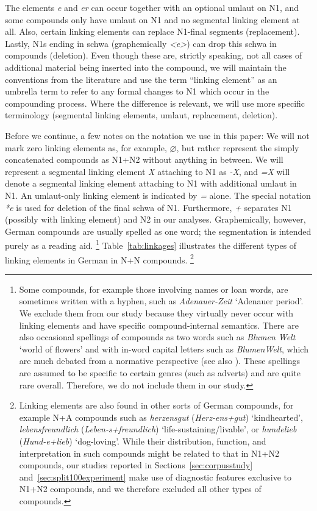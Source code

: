 The elements \textit{e} and \textit{er} can occur together with an optional umlaut on N1, and some compounds only have umlaut on N1 and no segmental linking element at all.
Also, certain linking elements can replace N1-final segments (replacement).
Lastly, N1s ending in schwa (graphemically \textit{<e>}) can drop this schwa in compounds (deletion).
Even though these are, strictly speaking, not all cases of additional material being inserted into the compound, we will maintain the conventions from the literature and use the term ``linking element'' as an umbrella term to refer to any formal changes to N1 which occur in the compounding process.
Where the difference is relevant, we will use more specific terminology (\ie segmental linking elements, umlaut, replacement, deletion).

Before we continue, a few notes on the notation we use in this paper: 
We will not mark zero linking elements as, for example, $\varnothing$, but rather represent the simply concatenated compounds as N1+N2 without anything in between. 
We will represent a segmental linking element \textit{X} attaching to N1 as \textit{-X}, and \textit{=X} will denote a segmental linking element attaching to N1 with additional umlaut in N1.
An umlaut-only linking element is indicated by \textit{=} alone.
The special notation \textit{*e} is used for deletion of the final schwa of N1.
Furthermore, \textit{+} separates N1 (possibly with linking element) and N2 in our analyses.
Graphemically, however, German compounds are usually spelled as one word; the segmentation is intended purely as a reading aid.%
	\footnote{Some compounds, for example those involving names or loan words, are sometimes written with a hyphen, such as \textit{Adenauer-Zeit} `Adenauer period'.
	We exclude them from our study because they virtually never occur with linking elements and have specific compound-internal semantics.
	There are also occasional spellings of compounds as two words such as \textit{Blumen Welt} `world of flowers' and with in-word capital letters such as \textit{BlumenWelt}, which are much debated from a normative perspective (see also \citealt{Scherer2012}).
	These spellings are assumed to be specific to certain genres (such as adverts) and are quite rare overall.
	Therefore, we do not include them in our study.}
Table~\ref{tab:linkages} illustrates the different types of linking elements in German in N+N compounds.%
	\footnote{Linking elements are also found in other sorts of German compounds, for example N+A compounds such as \textit{herzensgut} (\textit{Herz-ens+gut}) `kindhearted', \textit{lebensfreundlich} (\textit{Leben-s+freundlich}) `life-sustaining\slash livable', or \textit{hundelieb} (\textit{Hund-e+lieb}) `dog-loving'.
	While their distribution, function, and interpretation in such compounds might be related to that in N1+N2 compounds, our studies reported in Sections~\ref{sec:corpusstudy} and~\ref{sec:split100experiment} make use of diagnostic features exclusive to N1+N2 compounds, and we therefore excluded all other types of compounds.}

